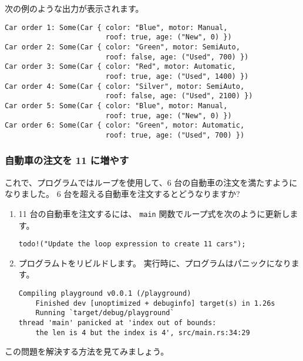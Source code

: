 次の例のような出力が表示されます。


\begin{lstlisting}[numbers=none]
Car order 1: Some(Car { color: "Blue", motor: Manual,
                        roof: true, age: ("New", 0) })
Car order 2: Some(Car { color: "Green", motor: SemiAuto,
                        roof: false, age: ("Used", 700) })
Car order 3: Some(Car { color: "Red", motor: Automatic,
                        roof: true, age: ("Used", 1400) })
Car order 4: Some(Car { color: "Silver", motor: SemiAuto,
                        roof: false, age: ("Used", 2100) })
Car order 5: Some(Car { color: "Blue", motor: Manual,
                        roof: true, age: ("New", 0) })
Car order 6: Some(Car { color: "Green", motor: Automatic,
                        roof: true, age: ("Used", 700) })
\end{lstlisting}

\subsubsection{自動車の注文を 11 に増やす}

これで、プログラムではループを使用して、6 台の自動車の注文を満たすようになりました。 6 台を超える自動車を注文するとどうなりますか?

\begin{enumerate}

\item 11 台の自動車を注文するには、 \texttt{main} 関数でループ式を次のように更新します。


\begin{lstlisting}[numbers=none]
    todo!("Update the loop expression to create 11 cars");
\end{lstlisting}

\item プログラムトをリビルドします。 実行時に、プログラムはパニックになります。

\begin{lstlisting}[numbers=none]
Compiling playground v0.0.1 (/playground)
    Finished dev [unoptimized + debuginfo] target(s) in 1.26s
    Running `target/debug/playground`
thread 'main' panicked at 'index out of bounds:
    the len is 4 but the index is 4', src/main.rs:34:29
\end{lstlisting}

\end{enumerate}

この問題を解決する方法を見てみましょう。


